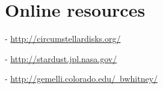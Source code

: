 \documentclass[11pt]{book}
\begin{document}
\appendix

%

%

%

%

%

%

\backmatter


\pagestyle{empty}

\chapter{Online resources}

\begin{footnotesize}

\noindent [1] - \href{http://circumstellardisks.org/}{http://circumstellardisks.org/}

\noindent [2] - \href{http://stardust.jpl.nasa.gov/}{http://stardust.jpl.nasa.gov/}

\noindent [3] - \href{http://gemelli.colorado.edu/~bwhitney/}{http://gemelli.colorado.edu/~bwhitney/}

\end{footnotesize}


\newpage

\ \\

\newpage


\end{document}
